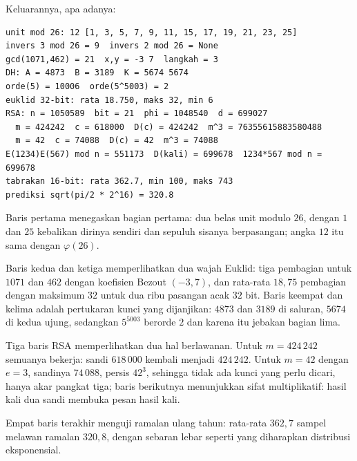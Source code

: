 \begin{lab}
Keluarannya, apa adanya:

\begin{verbatim}
unit mod 26: 12 [1, 3, 5, 7, 9, 11, 15, 17, 19, 21, 23, 25]
invers 3 mod 26 = 9  invers 2 mod 26 = None
gcd(1071,462) = 21  x,y = -3 7  langkah = 3
DH: A = 4873  B = 3189  K = 5674 5674
orde(5) = 10006  orde(5^5003) = 2
euklid 32-bit: rata 18.750, maks 32, min 6
RSA: n = 1050589  bit = 21  phi = 1048540  d = 699027
  m = 424242  c = 618000  D(c) = 424242  m^3 = 76355615883580488
  m = 42  c = 74088  D(c) = 42  m^3 = 74088
E(1234)E(567) mod n = 551173  D(kali) = 699678  1234*567 mod n = 699678
tabrakan 16-bit: rata 362.7, min 100, maks 743
prediksi sqrt(pi/2 * 2^16) = 320.8
\end{verbatim}
\end{lab}

Baris pertama menegaskan bagian pertama: dua belas unit modulo $26$, dengan $1$ dan $25$
kebalikan dirinya sendiri dan sepuluh sisanya berpasangan; angka $12$ itu sama dengan
$\varphi(26)$.

Baris kedua dan ketiga memperlihatkan dua wajah Euklid: tiga pembagian untuk $1071$ dan $462$
dengan koefisien Bezout $(-3,7)$, dan rata-rata $18{,}75$ pembagian dengan maksimum $32$ untuk
dua ribu pasangan acak $32$ bit. Baris keempat dan kelima adalah pertukaran kunci yang
dijanjikan: $4873$ dan $3189$ di saluran, $5674$ di kedua ujung, sedangkan $5^{5003}$ berorde
$2$ dan karena itu jebakan bagian lima.

Tiga baris RSA memperlihatkan dua hal berlawanan. Untuk $m=424\,242$ semuanya bekerja: sandi
$618\,000$ kembali menjadi $424\,242$. Untuk $m=42$ dengan $e=3$, sandinya $74\,088$, persis
$42^3$, sehingga tidak ada kunci yang perlu dicari, hanya akar pangkat tiga; baris berikutnya
menunjukkan sifat multiplikatif: hasil kali dua sandi membuka pesan hasil kali.

Empat baris terakhir menguji ramalan ulang tahun: rata-rata $362{,}7$ sampel melawan ramalan
$320{,}8$, dengan sebaran lebar seperti yang diharapkan distribusi eksponensial.

